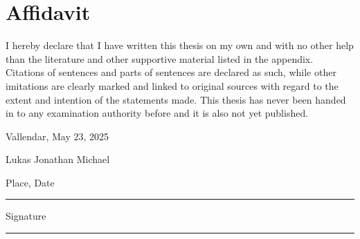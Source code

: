 \chapter*{Affidavit}
\thispagestyle{empty}

I hereby declare that I have written this thesis on my own and with no other help than the literature and other supportive material listed in the appendix. Citations of sentences and parts of sentences are declared as such, while other imitations are clearly marked and linked to original sources with regard to the extent and intention of the statements made. This thesis has never been handed in to any examination authority before and it is also not yet published.

\vspace{1cm}

\noindent
Vallendar, May 23, 2025

\vspace{1cm}

\noindent
Lukas Jonathan Michael

\vspace{1cm}

\noindent
\begin{minipage}{0.45\textwidth}
\centering
Place, Date \\[1.5cm]
\rule{4cm}{0.4pt}
\end{minipage}
\hfill
\begin{minipage}{0.45\textwidth}
\centering
Signature \\[1.5cm]
\rule{4cm}{0.4pt}
\end{minipage}